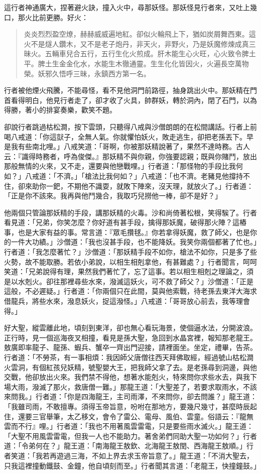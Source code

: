 這行者神通廣大，捏著避火訣，撞入火中，尋那妖怪。那妖怪見行者來，又吐上幾口，那火比前更勝。好火：
\begin{quote}
炎炎烈烈盈空燎，赫赫威威遍地紅。卻似火輪飛上下，猶如炭屑舞西東。這火不是燧人鑽木，又不是老子炮丹，非天火，非野火，乃是妖魔修煉成真三昧火。五輛車兒合五行，五行生化火煎成。肝木能生心火旺，心火致令脾土平。脾土生金金化水，水能生木徹通靈。生生化化皆因火，火遍長空萬物榮。妖邪久悟呼三昧，永鎮西方第一名。
\end{quote}

行者被他煙火飛騰，不能尋怪，看不見他洞門前路徑，抽身跳出火中。那妖精在門首看得明白，他見行者走了，卻才收了火具，帥群妖，轉於洞內，閉了石門，以為得勝，著小的排宴奏樂，歡笑不題。

卻說行者跳過枯松澗，按下雲頭，只聽得八戒與沙僧朗朗的在松間講話。行者上前喝八戒道：「你這獃子，全無人氣。你就懼怕妖火，敗走逃生，卻把老孫丟下。早是我有些南北哩。」八戒笑道：「哥啊，你被那妖精說著了，果然不達時務。古人云：『識得時務者，呼為俊傑。』那妖精不與你親，你強要認親；既與你賭鬥，放出那般無情的火來，又不走，還要與他戀戰哩。」行者道：「那怪物的手段比我何如？」八戒道：「不濟。」「槍法比我何如？」八戒道：「也不濟。老豬見他撐持不住，卻來助你一鈀，不期他不識耍，就敗下陣來，沒天理，就放火了。」行者道：「正是你不該來。我再與他鬥幾合，我取巧兒撈他一棒，卻不是好？」

他兩個只管論那妖精的手段，講那妖精的火毒。沙和尚倚著松根，笑得騃了。行者看見道：「兄弟，你笑怎麼？你好道有甚手段，擒得那妖魔，破得那火陣？這樁事，也是大家有益的事。常言道：『眾毛攢毬。』你若拿得妖魔，救了師父，也是你的一件大功績。」沙僧道：「我也沒甚手段，也不能降妖。我笑你兩個都著了忙也。」行者道：「我怎麼著忙？」沙僧道：「那妖精手段不如你，槍法不如你，只是多了些火勢，故不能取勝。若依小弟說，以相生相剋拿他，有甚難處？」行者聞言，呵呵笑道：「兄弟說得有理，果然我們著忙了，忘了這事。若以相生相剋之理論之，須是以水剋火。卻往那裡尋些水來，潑滅這妖火，可不救了師父？」沙僧道：「正是這般，不必遲疑。」行者道：「你兩個只在此間，莫與他索戰，待老孫去東洋大海求借龍兵，將些水來，潑息妖火，捉這潑怪。」八戒道：「哥哥放心前去，我等理會得。」

好大聖，縱雲離此地，頃刻到東洋，卻也無心看玩海景，使個逼水法，分開波浪。正行時，見一個巡海夜叉相撞，看見是孫大聖，急回到水晶宮裡，報知那老龍王。敖廣即率龍子、龍孫、蝦兵、蟹卒一齊出門迎接，請裡面坐。坐定，禮畢，告茶。行者道：「不勞茶，有一事相煩：我因師父唐僧往西天拜佛取經，經過號山枯松澗火雲洞，有個紅孩兒妖精，號聖嬰大王，把我師父拿了去。是老孫尋到洞邊，與他交戰，他卻放出火來。我們禁不得他，想著水能剋火，特來問你求些水去，與我下場大雨，潑滅了那火，救唐僧一難。」那龍王道：「大聖差了，若要求取雨水，不該來問我。」行者道：「你是四海龍王，主司雨澤，不來問你，卻去問誰？」龍王道：「我雖司雨，不敢擅專。須得玉帝旨意，吩咐在那地方，要幾尺幾寸，甚麼時辰起住，還要三官舉筆，太乙移文，會令了雷公、電母、風伯、雲童。俗語云：『龍無雲而不行』哩。」行者道：「我也不用著風雲雷電，只是要些雨水滅火。」龍王道：「大聖不用風雲雷電，但我一人也不能助力。著舍弟們同助大聖一功如何？」行者道：「令弟何在？」龍王道：「南海龍王敖欽、北海龍王敖閏、西海龍王敖順。」行者笑道：「我若再遊過三海，不如上界去求玉帝旨意了。」龍王道：「不消大聖去，只我這裡撞動鐵鼓、金鐘，他自頃刻而至。」行者聞其言道：「老龍王，快撞鐘鼓。」

